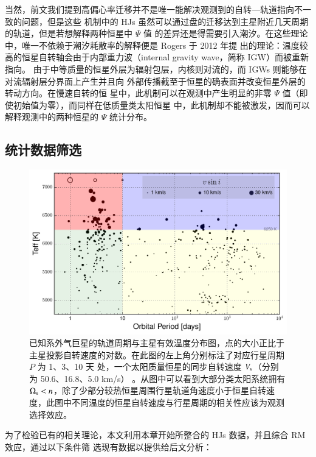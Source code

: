 当然，前文我们提到高偏心率迁移并不是唯一能解决观测到的自转---轨道指向不一致的问题，但是这些
机制中的 HJs 虽然可以通过盘的迁移达到主星附近几天周期的轨道，但是若想解释两种恒星中 $\Psi$ 值
的差异还是得需要引入潮汐。在这些理论中，唯一不依赖于潮汐耗散率的解释便是 Rogers 于 2012 年提
出的理论：温度较高的恒星自转轴会由于内部重力波（internal gravity wave，简称 IGW）而被重新指向。
由于中等质量的恒星外层为辐射包层，内核则对流的，而 IGWs 则能够在对流辐射层分界面上产生并且向
外部传播截至于恒星的确表面并改变恒星外层的转动方向\cite{Rogers2012,Rogers2015}。在慢速自转的恒
星中，此机制可以在观测中产生明显的非零 $\Psi$ 值（即使初始值为零），而同样在低质量类太阳恒星
中，此机制却不能被激发，因而可以解释观测中的两种恒星的 $\Psi$ 统计分布。


\subsection{统计数据筛选}

\begin{figure}[t]
\centering
\includegraphics[width=1.0\textwidth]{figures/chapter4/fig8_perteff.pdf}
\caption{已知系外气巨星的轨道周期与主星有效温度分布图，点的大小正比于主星投影自转速度的对数。在此图的左上角分别标注了对应行星周期 $P$ 为 1、3、10 天 处，一个太阳质量恒星的同步自转速度 $V_\mathrm{s} $（分别为 50.6、16.8、5.0 km/s） 。从图中可以看到大部分类太阳系统拥有 $\Omega_\mathrm{s} < n$，除了少部分较热恒星周围行星轨道角速度小于恒星自转速度，此图中不同温度的恒星自转速度与行星周期的相关性应该为观测选择效应。}
\label{fig:perteff}
\end{figure}

为了检验已有的相关理论，本文利用本章开始所整合的 HJs 数据，并且综合 RM 效应，通过以下条件筛
选现有数据以提供给后文分析：

